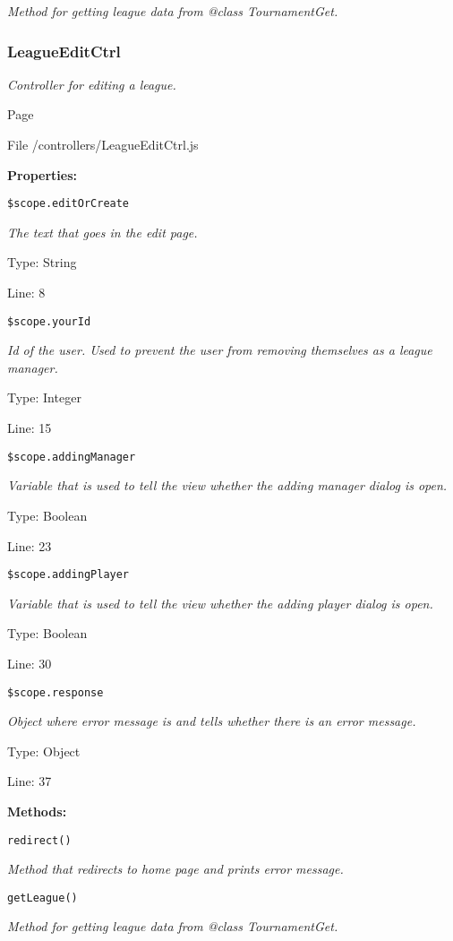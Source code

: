 {\scriptsize
\textit{Method for getting league data from @class TournamentGet.}

}

\subsubsection{LeagueEditCtrl}
\textit{Controller for editing a league.}

Page \pageref{LeagueEditCtrl.js}

File /controllers/LeagueEditCtrl.js

\textbf{Properties:}

\texttt{\$scope.editOrCreate}

{\scriptsize
\textit{The text that goes in the edit page.}

Type: String

Line: 8

}
\texttt{\$scope.yourId}

{\scriptsize
\textit{Id of the user.
Used to prevent the user from removing themselves as a league manager.}

Type: Integer

Line: 15

}
\texttt{\$scope.addingManager}

{\scriptsize
\textit{Variable that is used to tell the view whether the adding manager dialog is open.}

Type: Boolean

Line: 23

}
\texttt{\$scope.addingPlayer}

{\scriptsize
\textit{Variable that is used to tell the view whether the adding player dialog is open.}

Type: Boolean

Line: 30

}
\texttt{\$scope.response}

{\scriptsize
\textit{Object where error message is and tells whether there is an error message.}

Type: Object

Line: 37

}
\textbf{Methods:}

\texttt{redirect()}

{\scriptsize
\textit{Method that redirects to home page and prints error message.}

}

\texttt{getLeague()}

{\scriptsize
\textit{Method for getting league data from @class TournamentGet.}

}

